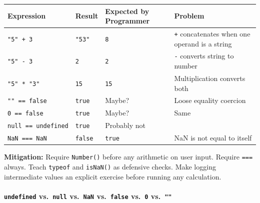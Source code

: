 \documentclass[
  justified,
  openright,
]{tufte-book}
\let\subsubsection\paragraph
\let\paragraph\paragraph
\let\subsubsection\paragraph
\let\paragraph\paragraph
\begin{document}
{\def\LTcaptype{none} %
\begin{longtable}[]{@{}
  >{\raggedright\arraybackslash}p{}
  >{\raggedright\arraybackslash}p{}
  >{\raggedright\arraybackslash}p{}
  >{\raggedright\arraybackslash}p{}@{}}
\toprule\noalign{}
\begin{minipage}[b]{\linewidth}\raggedright
Expression
\end{minipage} & \begin{minipage}[b]{\linewidth}\raggedright
Result
\end{minipage} & \begin{minipage}[b]{\linewidth}\raggedright
Expected by Programmer
\end{minipage} & \begin{minipage}[b]{\linewidth}\raggedright
Problem
\end{minipage} \\
\midrule\noalign{}
\endhead
\bottomrule\noalign{}
\endlastfoot
\texttt{"5"\ +\ 3} & \texttt{"53"} & \texttt{8} & \texttt{+}
concatenates when one operand is a string \\
\texttt{"5"\ -\ 3} & \texttt{2} & \texttt{2} & \texttt{-} converts
string to number \\
\texttt{"5"\ *\ "3"} & \texttt{15} & \texttt{15} & Multiplication
converts both \\
\texttt{""\ ==\ false} & \texttt{true} & Maybe? & Loose equality
coercion \\
\texttt{0\ ==\ false} & \texttt{true} & Maybe? & Same \\
\texttt{null\ ==\ undefined} & \texttt{true} & Probably not & \\
\texttt{NaN\ ===\ NaN} & \texttt{false} & \texttt{true} & NaN is not
equal to itself \\
\end{longtable}
}

\textbf{Mitigation:} Require \texttt{Number()} before any arithmetic on
user input. Require \texttt{===} always. Teach \texttt{typeof} and
\texttt{isNaN()} as defensive checks. Make logging intermediate values
an explicit exercise before running any calculation.

\subsubsection{\texorpdfstring{\texttt{undefined} vs.~\texttt{null}
vs.~\texttt{NaN} vs.~\texttt{false} vs.~\texttt{0}
vs.~\texttt{""}}{undefined vs.~null vs.~NaN vs.~false vs.~0 vs.~""}}\label{undefined-vs.-null-vs.-nan-vs.-false-vs.-0-vs.}
\end{document}
